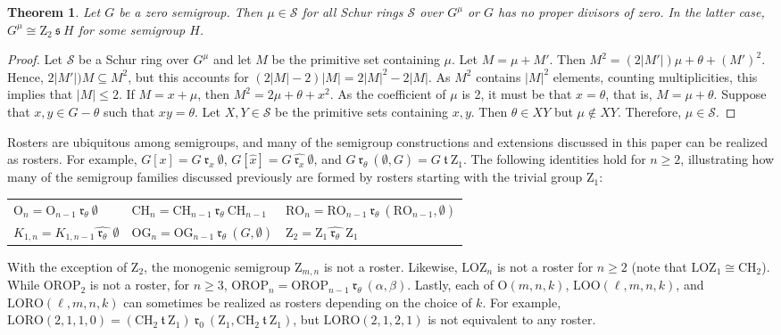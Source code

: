 \documentclass{article}
\theoremstyle{plain}
\newtheorem{Thm}{Theorem}[section]
\theoremstyle{definition}
\renewcommand{\S}{\mathcal{S}}
\renewcommand{\O}{\mathrm{O}}
\newcommand{\RO}{\mathrm{RO}}
\newcommand{\ORO}{\mathrm{ORO}}
\newcommand{\OROP}{\mathrm{OROP}}
\newcommand{\LOZ}{\mathrm{LOZ}}
\newcommand{\LOO}{\mathrm{LOO}}
\newcommand{\LORO}{\mathrm{LORO}}
\newcommand{\CH}{\mathrm{CH}}
\newcommand{\z}{\mathrm{Z}}
\newcommand{\OG}{\mathrm{OG}}
\newcommand{\s}{\ \mathfrak{s}\ }
\renewcommand{\t}{\ \mathfrak{t}\ }
\renewcommand{\r}[1]{\ \mathfrak{r}_{#1}\ }
\newcommand{\rhat}[1]{\ \widehat{\mathfrak{r}_{#1}}\ }
\begin{document}
\begin{Thm}
    Let $G$ be a zero semigroup. Then $\mu\in \S$ for all Schur rings $\S$ over $G^\mu$ or $G$ has no proper divisors of zero. In the latter case, $G^\mu \cong \z_2\s H$ for some semigroup $H$.
\end{Thm}
\begin{proof}
    Let $\S$ be a Schur ring over $G^\mu$ and let $M$ be the primitive set containing $\mu$. Let $M = \mu + M'$. Then $M^2 = (2|M'|)\mu+\theta+(M')^2$. Hence, $2|M'|)M\subseteq M^2$, but this accounts for $(2|M|-2)|M| = 2|M|^2-2|M|$. As $M^2$ contains $|M|^2$ elements, counting multiplicities, this implies that $|M|\le 2$. If $M = x+\mu$, then $M^2 = 2\mu+\theta+x^2$. As the coefficient of $\mu$ is 2, it must be that $x=\theta$, that is, $M=\mu+\theta$. 
    Suppose that $x,y\in G-\theta$ such that $xy=\theta$. Let $X,Y\in\S$ be the primitive sets containing $x,y$. Then $\theta\in XY$ but $\mu\notin XY$. Therefore, $\mu\in \S$.
\end{proof}

Rosters are ubiquitous among semigroups, and many of the semigroup constructions and extensions discussed in this paper can be realized as rosters. For example, $G[x] = G\r x \emptyset$, $G[\hat{x}] = G\rhat x \emptyset$, and $G\r\theta (\emptyset,G)= G\t \z_1$. The following identities hold for $n\ge 2$, illustrating how many of the semigroup families discussed previously are formed by rosters starting with the trivial group $\z_1$: 
\begin{center}
\begin{tabular}{lll}
$\O_n = \O_{n-1} \r{\theta} \emptyset$ & $\CH_n = \CH_{n-1} \r{\theta} \CH_{n-1}$  &$\RO_{n}=\RO_{n-1}\r{\theta} (\RO_{n-1}, \emptyset)$\\
$K_{1,n} = K_{1, n-1} \widehat{\r{\theta}}\ \emptyset$ & $\OG_n = \OG_{n-1} \r{\theta} (G,\emptyset)$ &  
$\z_2 = \z_1 \widehat{\r{\theta}}\ \z_1$
\end{tabular}
\end{center}
With the exception of $\z_2$, the monogenic semigroup $\z_{m,n}$ is not a roster. Likewise, $\LOZ_n$ is not a roster for $n\ge 2$ (note that $\LOZ_1\cong \CH_2$). While $\OROP_2$ is not a roster, for $n\ge3$, $\OROP_n = \OROP_{n-1} \r{\theta} (\alpha, \beta)$. Lastly, each of $\O(m,n,k)$, $\LOO(\ell,m,n,k)$, and $\LORO(\ell,m,n,k)$ can sometimes be realized as rosters depending on the choice of $k$. For example, $\LORO(2,1,1,0) = (\CH_2\t\z_1)\r0 (\z_1,\CH_2\t\z_1)$, but $\LORO(2,1,2,1)$ is not equivalent to any roster.
\end{document}
